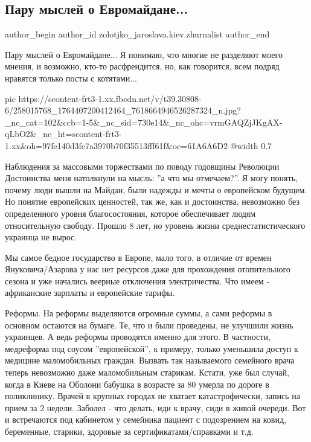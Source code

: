  
 
 
 
 
 
\subsection{Пару мыслей о Евромайдане...}
\label{sec:22_11_2021.fb.zolotjko_jaroslava.kiev.zhurnalist.1.mysli_o_evromaidane}
 
\ifcmt
 author_begin
   author_id zolotjko_jaroslava.kiev.zhurnalist
 author_end
\fi

Пару мыслей о Евромайдане... Я понимаю, что многие не разделяют моего мнения, и
возможно, кто-то расфрендится, но, как говорится, всем подряд нравятся только
посты с котятами...

\ifcmt
  pic https://scontent-frt3-1.xx.fbcdn.net/v/t39.30808-6/258015768_1764407200412464_7618664946526287324_n.jpg?_nc_cat=102&ccb=1-5&_nc_sid=730e14&_nc_ohc=vrmGAQZjJKgAX-qLbO2&_nc_ht=scontent-frt3-1.xx&oh=97fe140d3fc7a3970b70f35513fff61f&oe=61A6A6D2
  @width 0.7
\fi

Наблюдения за массовыми торжествами по поводу годовщины Революции Достоинства
меня натолкнули на мысль: ''а что мы отмечаем?''. Я могу понять, почему люди
вышли на Майдан, были надежды и мечты о европейском будущем. Но понятие
европейских ценностей, так же, как и достоинства, невозможно без определенного
уровня благосостояния, которое обеспечивает людям относительную свободу. Прошло
8 лет, но уровень жизни среднестатистического украинца не вырос.

Мы самое бедное государство в Европе, мало того, в отличие от времен
Януковича/Азарова у нас нет ресурсов даже для прохождения отопительного сезона
и уже начались веерные отключения электричества.  Что имеем - африканские
зарплаты и европейские тарифы. 

Реформы. На реформы выделяются огромные суммы, а сами реформы в основном
остаются на бумаге. Те, что и были проведены, не улучшили жизнь украинцев. А
ведь реформы проводятся именно для этого. В частности, медреформа под соусом
''европейской'', к примеру, только уменьшила доступ к медицине маломобильных
граждан. Вызвать так называемого семейного врача теперь невозможно даже
маломобильным старикам. Кстати, уже был случай, когда в Киеве на Оболони
бабушка в возрасте за 80 умерла по дороге в поликлинику. Врачей в крупных
городах не хватает катастрофически, запись на прием за 2 недели. Заболел - что
делать, иди к врачу, сиди в живой очереди. Вот и встречаются под кабинетом у
семейника пациент с подозрением на ковид, беременные, старики, здоровые за
сертификатами/справками и т.д.

